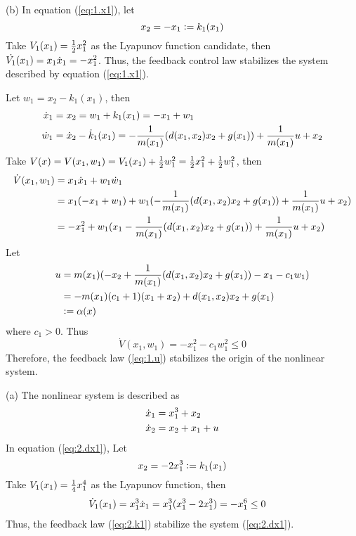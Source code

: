 \documentclass[a4 paper, 12pt]{article}
\begin{document}
(b) In equation (\ref{eq:1.x1}), let 
\begin{equation}
        x_2 = -x_1 \mathrel{\mathop:}= k_1(x_1)
\end{equation}
Take $V_1(x_1) = \frac{1}{2} x_1^2$ as the Lyapunov function candidate, then $\dot{V_1}(x_1) = x_1\dot{x}_1 = -x_1^2$. Thus, the feedback control law stabilizes the system described by equation (\ref{eq:1.x1}). 

Let $w_1 = x_2 - k_1(x_1)$, then 
\begin{align}
        \dot{x}_1 &= x_2 = w_1 + k_1(x_1) = -x_1 + w_1 \\
        \dot{w}_1 &= \dot{x}_2 - \dot{k}_1(x_1) = -\frac{1}{m(x_1)}(d(x_1,x_2)x_2+g(x_1)) + \frac{1}{m(x_1)}u + x_2
\end{align}
Take $V(x) = V(x_1,w_1) = V_1(x_1) + \frac{1}{2} w_1^2 = \frac{1}{2} x_1^2 + \frac{1}{2} w_1^2$, then 
\begin{equation}
        \begin{aligned}
                \dot{V}(x_1,w_1) &= x_1\dot{x}_1 + w_1\dot{w}_1 \\
                &= x_1(-x_1+w_1) + w_1(-\frac{1}{m(x_1)}(d(x_1,x_2)x_2+g(x_1))+\frac{1}{m(x_1)}u+x_2) \\
                &= -x_1^2 + w_1(x_1-\frac{1}{m(x_1)}(d(x_1,x_2)x_2+g(x_1))+\frac{1}{m(x_1)}u+x_2)
        \end{aligned}
\end{equation}
Let 
\begin{equation}\label{eq:1.u}
        \begin{aligned}
                u &= m(x_1)(-x_2 + \frac{1}{m(x_1)}(d(x_1,x_2)x_2+g(x_1)) -x_1 - c_1w_1) \\
                &= -m(x_1)(c_1+1)(x_1+x_2) + d(x_1,x_2)x_2 + g(x_1) \\
                &\mathrel{\mathop:}= \alpha(x)
        \end{aligned}
\end{equation}
where $c_1 > 0$. Thus
\begin{equation}
        \dot{V}(x_1,w_1) = -x_1^2 - c_1w_1^2 \leq 0
\end{equation}
Therefore, the feedback law (\ref{eq:1.u}) stabilizes the origin of the nonlinear system.



 (a) The nonlinear system is described as
\begin{align}
        \dot{x}_1 &= x_1^3 + x_2 \label{eq:2.dx1} \\
        \dot{x}_2 &= x_2 + x_1 + u \label{eq:2.dx2}
\end{align}
In equation (\ref{eq:2.dx1}), Let
\begin{equation}\label{eq:2.k1}
        x_2 = -2x_1^3 \mathrel{\mathop:}= k_1(x_1)
\end{equation}
Take $V_1(x_1) = \frac{1}{4} x_1^4$ as the Lyapunov function, then
\begin{equation}
        \begin{aligned}
                \dot{V}_1(x_1) &= x_1^3\dot{x}_1 = x_1^3(x_1^3-2x_1^3) = -x_1^6 \leq 0
        \end{aligned}
\end{equation}
Thus, the feedback law (\ref{eq:2.k1}) stabilize the system (\ref{eq:2.dx1}).
\end{document}
